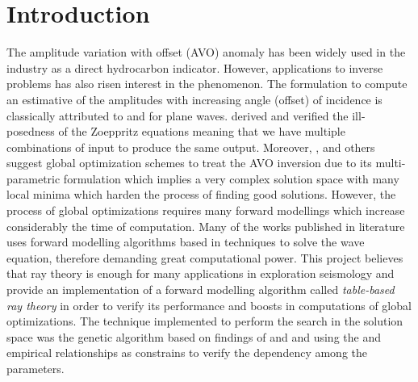 \documentclass{vie16}
\begin{document}
\section{Introduction}
The amplitude variation with offset (AVO) anomaly has been widely used in 
the industry as a direct hydrocarbon indicator. However, applications to 
inverse problems has also risen interest in the phenomenon. The 
formulation to compute an estimative of the amplitudes with increasing 
angle (offset) of incidence is classically attributed to \cite{Zoeppritz1919} 
and \cite{Knott1899} for plane waves. \cite{Rosa1976} derived and verified 
the ill-posedness of the Zoeppritz equations meaning that we have multiple 
combinations of input to produce the same output.  Moreover, 
\cite{Stoffa1991}, \cite{Mallick1995} and others suggest global optimization 
schemes to treat the AVO inversion due to its multi-parametric formulation 
which implies a very complex solution space with many local minima which 
harden the process of finding good solutions. However, the process of 
global optimizations requires many forward modellings which increase 
considerably the time of computation. Many of the works published in 
literature uses forward modelling algorithms based in techniques to solve 
the wave equation, therefore demanding great computational power. This 
project believes that ray theory is enough for many applications in 
exploration seismology and provide an implementation of a forward 
modelling algorithm called \textit{table-based ray theory} in order to
verify its performance and boosts in computations of global optimizations.
The technique implemented to perform the search in the solution space was
the genetic algorithm based on findings of \cite{Stoffa1991} and
\cite{Sen1992} and using the \cite{Gardner1974} and \cite{Castagna1985}
empirical relationships as constrains to verify the dependency among the
parameters.
\end{document}
